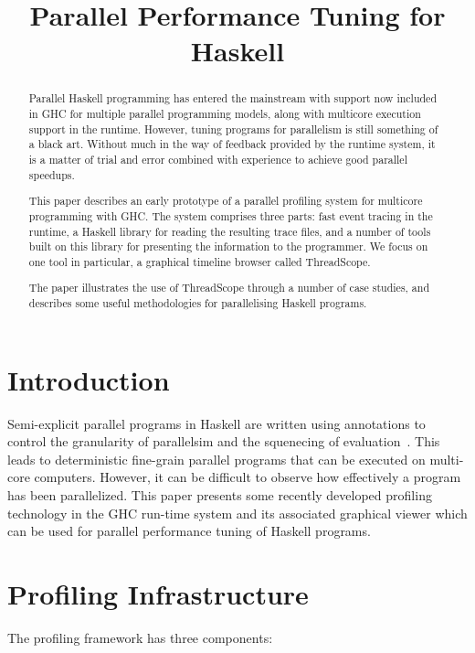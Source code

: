 \documentclass[twocolumn,9pt]{sigplanconf}
\title{Parallel Performance Tuning for Haskell}
\let\cite=\citep
\begin{document}
\maketitle

\begin{abstract}
Parallel Haskell programming has entered the mainstream with support
now included in GHC for multiple parallel programming models, along
with multicore execution support in the runtime.  However, tuning
programs for parallelism is still something of a black art.  Without
much in the way of feedback provided by the runtime system, it is a
matter of trial and error combined with experience to achieve good
parallel speedups.

This paper describes an early prototype of a parallel profiling system
for multicore programming with GHC.  The system comprises three parts:
fast event tracing in the runtime, a Haskell library for reading the
resulting trace files, and a number of tools built on this library for
presenting the information to the programmer.  We focus on one tool in
particular, a graphical timeline browser called ThreadScope.

The paper illustrates the use of ThreadScope through a number of case
studies, and describes some useful methodologies for parallelising
Haskell programs.
\end{abstract}


\section{Introduction}
Semi-explicit parallel programs in Haskell are written using annotations to control the granularity of parallelsim and the squenecing of evaluation~\cite{spj:trin98b}. This leads to deterministic fine-grain parallel programs that can be executed on multi-core computers. However, it can be difficult to observe how effectively a program has been parallelized. This paper presents some recently developed profiling technology in the GHC run-time system and its associated graphical viewer which can be used for parallel performance tuning of Haskell programs.



\section{Profiling Infrastructure}
The profiling framework has three components:
\end{document}
